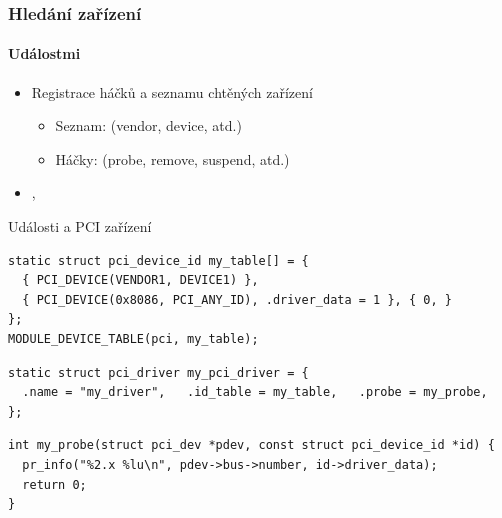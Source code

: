 \begin{frame}[fragile]
  \frametitle{Hledání zařízení}
  \iffimuni\framesubtitle{Událostmi}\fi

  \begin{itemize}
    \item Registrace háčků a seznamu chtěných zařízení
    \begin{itemize}
      \item Seznam:  (vendor, device, atd.)
      \pause
      \item Háčky:  (probe, remove, suspend, atd.)
    \end{itemize}


    \item {}, 
  \end{itemize}

  \begin{block}{\footnotesize Události a PCI zařízení}
    \begin{lstlisting}[aboveskip=2pt,belowskip=0pt]
static struct pci_device_id my_table[] = {
  { PCI_DEVICE(VENDOR1, DEVICE1) },
  { PCI_DEVICE(0x8086, PCI_ANY_ID), .driver_data = 1 }, { 0, }
};
MODULE_DEVICE_TABLE(pci, my_table);
    \end{lstlisting}
    \begin{lstlisting}[aboveskip=0pt,belowskip=0pt]
static struct pci_driver my_pci_driver = {
  .name = "my_driver",   .id_table = my_table,   .probe = my_probe,
};
    \end{lstlisting}
    \begin{lstlisting}[aboveskip=0pt,belowskip=2pt]
int my_probe(struct pci_dev *pdev, const struct pci_device_id *id) {
  pr_info("%2.x %lu\n", pdev->bus->number, id->driver_data);
  return 0;
}
    \end{lstlisting} %
  \end{block}

\end{frame}

